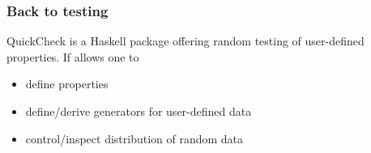 \documentclass{beamer}
\begin{document}
\begin{frame}
\frametitle{Back to testing}

QuickCheck is a Haskell package offering random testing of
user-defined properties. If allows one to

\begin{itemize}
\item define properties
\item define/derive generators for user-defined data
\item control/inspect distribution of random data
\end{itemize}

\end{frame}
\end{document}
